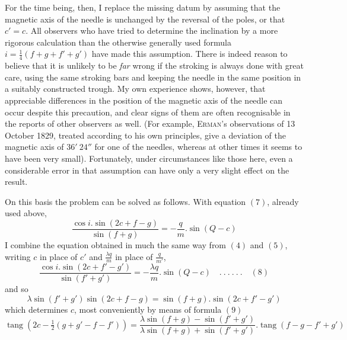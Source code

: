 For the time being, then, I replace the missing datum by assuming that the magnetic axis of the needle is unchanged by the reversal of the poles, or that $c'=c$. All observers who have tried to determine the inclination by a more rigorous calculation than the otherwise generally used formula $i=\frac14(f+g+f'+g')$ have made
this assumption. There is indeed reason to believe that it is unlikely to be \textit{far} wrong if the stroking is always done with great care, using the same stroking bars and keeping the needle in the same position in a suitably constructed trough. My own experience shows, however, that appreciable differences in the position of the magnetic axis of the needle can occur despite this precaution, and clear signs of them are often recognisable in the reports of other observers as well. (For example, \textsc{Erman}'s observations of 13 October 1829, treated according to his own principles, give a deviation of the magnetic axis of $36'\ 24''$ for one of the needles, whereas at other times it seems to have been very small). Fortunately, under circumstances like those here, even a considerable error in that assumption can have only a very slight effect on the result.

On this basis the problem can be solved as follows. With equation $(7)$, already used above,
\[
\frac{\cos i.\sin(2c+f-g)}{\sin(f+g)}=-\frac{q}{m}.\sin(Q-c)
\]
I combine the equation obtained in much the same way from $(4)$ and $(5)$, writing $c$ in place of $c'$ and $\frac{\lambda q}{m}$ in place of $\frac{q}{m'}$,
\[
\frac{\cos i.\sin(2c+f'-g')}{\sin(f'+g')}=-\frac{\lambda q}{m}.\sin(Q-c)\quad.\ .\ .\ .\ .\ .\quad(8)
\]
and so
\[
\lambda\sin(f'+g')\sin(2c+f-g)=\sin(f+g).\sin(2c+f'-g')
\]
which determines $c$, most conveniently by means of formula $(9)$
\[
\operatorname{tang}(2c-\tfrac12(g+g'-f-f'))=\frac{\lambda\sin(f+g)-\sin(f'+g')}{\lambda\sin(f+g)+\sin(f'+g')}.\operatorname{tang}(f-g-f'+g')
\]


